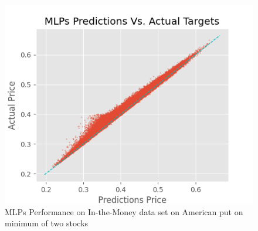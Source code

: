 \begin{figure}[th]
\centering
\includegraphics{Figures/inMoneyAmerMinP.png}
\decoRule
\caption[MLPs Performance on In-the-Money data set on American bivariate contingent claim]{MLPs Performance on In-the-Money data set on American put on minimum of two stocks}
\label{fig:MLPsAmerMin2}
\end{figure}




